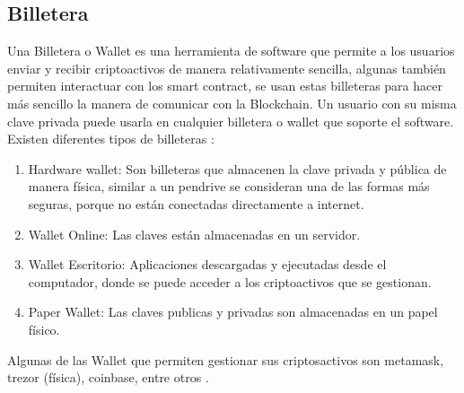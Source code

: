 \subsection{Billetera}
Una Billetera o Wallet es una herramienta de software que permite a los usuarios enviar y recibir
criptoactivos de manera relativamente sencilla, algunas también permiten interactuar con los smart contract,
se usan estas billeteras para hacer más sencillo la manera de comunicar con la Blockchain.
Un usuario con su misma clave privada puede usarla en cualquier billetera o wallet que soporte el software.
Existen diferentes tipos de billeteras \cite[]{dannen_introducing_2017,ambito_cuales_2021,rezaeighaleh_new_2019}:
\begin{enumerate}
\item Hardware wallet: Son billeteras que almacenen la clave privada y pública de manera física, similar 
a un pendrive se consideran una de las formas más seguras, porque no están conectadas directamente a internet.
\item Wallet Online: Las claves están almacenadas en un servidor.
\item Wallet Escritorio: Aplicaciones descargadas y ejecutadas desde el computador, donde se puede acceder
a los criptoactivos que se gestionan.
\item Paper Wallet:  Las claves publicas y privadas son almacenadas en un papel físico.
\end{enumerate}

Algunas de las Wallet que permiten gestionar sus criptosactivos son metamask, trezor (física), coinbase, entre otros \cite[]{dannen_introducing_2017,ambito_cuales_2021,coinsenda_tipos_2019}.